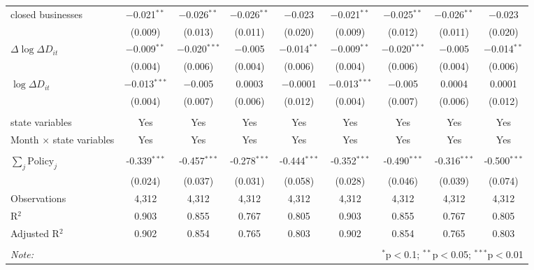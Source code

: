 \begin{tabular}{@{\extracolsep{1pt}}lcccccccc}
  closed businesses & $-$0.021$^{**}$ & $-$0.026$^{**}$ & $-$0.026$^{**}$ & $-$0.023 & $-$0.021$^{**}$ & $-$0.025$^{**}$ & $-$0.026$^{**}$ & $-$0.023 \\ 
  & (0.009) & (0.013) & (0.011) & (0.020) & (0.009) & (0.012) & (0.011) & (0.020) \\ 
  $\Delta \log \Delta D_{it}$ & $-$0.009$^{**}$ & $-$0.020$^{***}$ & $-$0.005 & $-$0.014$^{**}$ & $-$0.009$^{**}$ & $-$0.020$^{***}$ & $-$0.005 & $-$0.014$^{**}$ \\ 
  & (0.004) & (0.006) & (0.004) & (0.006) & (0.004) & (0.006) & (0.004) & (0.006) \\ 
  $\log \Delta D_{it}$ & $-$0.013$^{***}$ & $-$0.005 & 0.0003 & $-$0.0001 & $-$0.013$^{***}$ & $-$0.005 & 0.0004 & 0.0001 \\ 
  & (0.004) & (0.007) & (0.006) & (0.012) & (0.004) & (0.007) & (0.006) & (0.012) \\ 
 \hline \\[-1.8ex] 
state variables & Yes & Yes & Yes & Yes & Yes & Yes & Yes & Yes \\ 
Month $\times$ state variables & Yes & Yes & Yes & Yes & Yes & Yes & Yes & Yes \\ 
\hline \\[-1.8ex] 
$\sum_j \mathrm{Policy}_j$ & -0.339$^{***}$ & -0.457$^{***}$ & -0.278$^{***}$ & -0.444$^{***}$ & -0.352$^{***}$ & -0.490$^{***}$ & -0.316$^{***}$ & -0.500$^{***}$ \\ 
 & (0.024) & (0.037) & (0.031) & (0.058) & (0.028) & (0.046) & (0.039) & (0.074) \\ 
Observations & 4,312 & 4,312 & 4,312 & 4,312 & 4,312 & 4,312 & 4,312 & 4,312 \\ 
R$^{2}$ & 0.903 & 0.855 & 0.767 & 0.805 & 0.903 & 0.855 & 0.767 & 0.805 \\ 
Adjusted R$^{2}$ & 0.902 & 0.854 & 0.765 & 0.803 & 0.902 & 0.854 & 0.765 & 0.803 \\ 
\hline 
\hline \\[-1.8ex] 
\textit{Note:}  & \multicolumn{8}{r}{$^{*}$p$<$0.1; $^{**}$p$<$0.05; $^{***}$p$<$0.01} \\ 
\end{tabular} 